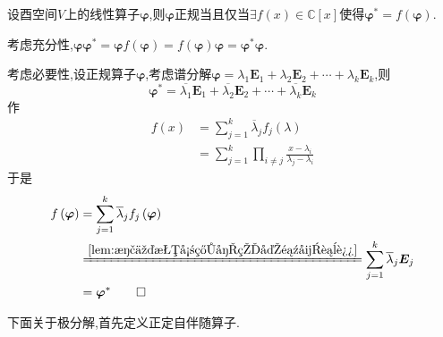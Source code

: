 \begin{formal}
    \begin{theorem}[正规伴随的多项式表示]\label{thm:正规伴随的多项式表示}
        设酉空间$V$上的线性算子$\bm{\varphi}$,则$\bm{\varphi}$正规当且仅当$\exists f\left(x\right)\in\mathbb{C}\left[x\right]$使得$\bm{\varphi}^*=f\left(\bm{\varphi}\right)$.
    \end{theorem}
    \begin{Proof}
        考虑充分性,$\bm{\varphi\varphi}^*=\bm{\varphi}f\left(\bm{\varphi}\right)=f\left(\bm{\varphi}\right)\bm{\varphi}=\bm{\varphi}^*\bm{\varphi}.$

        考虑必要性,设正规算子$\bm{\varphi}$,考虑谱分解$\bm{\varphi}=\lambda_1\bm{E}_1+\lambda_2\bm{E}_2+\cdots+\lambda_k\bm{E}_k$,则\[
        \bm{\varphi}^*=\overline{\lambda_1}\bm{E}_1+\overline{\lambda_2}\bm{E}_2+\cdots+\overline{\lambda_k}\bm{E}_k
        \]作\begin{align*}
            f\left(x\right)&=\sum_{j=1}^{k}\overline{\lambda}_jf_j\left(\lambda\right)\\
            &=\sum_{j=1}^{k}\prod_{i\neq j}\frac{x-\lambda_i}{\lambda_j-\lambda_i}
        \end{align*}于是\begin{align*}
            f\left(\bm{\varphi}\right)&=\sum_{j=1}^{k}\overline{\lambda}_jf_j\left(\bm{\varphi}\right)\\
            &\xlongequal{\cref{lem:正交投影算子的多项式表达}}\sum_{j=1}^{k}\overline{\lambda}_j\bm{E}_j\\
            &=\bm{\varphi}^*\qedhere
        \end{align*}
    \end{Proof}
\end{formal}
\begin{red}
    \begin{remark}
        下面关于极分解,首先定义正定自伴随算子.
    \end{remark}
\end{red}

